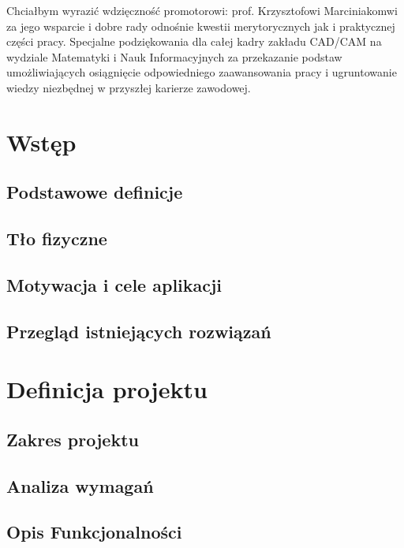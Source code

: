 \documentclass[12pt, oneside]{report}
\theoremstyle{definition}
\begin{document}
Chciałbym wyrazić wdzięczność promotorowi: prof. Krzysztofowi Marciniakomwi za jego wsparcie i dobre rady odnośnie kwestii merytorycznych jak i praktycznej części pracy. Specjalne podziękowania dla całej kadry zakładu CAD/CAM na wydziale Matematyki i Nauk Informacyjnych za przekazanie podstaw umożliwiających osiągnięcie odpowiedniego zaawansowania pracy i ugruntowanie wiedzy niezbędnej w przyszłej karierze zawodowej.

\vspace{\fill}

\newpage
\pagestyle{plain}
\setcounter{page}{5}
\tableofcontents

\newpage
\pagestyle{headings}

\chapter{Wstęp}
\section{Podstawowe definicje}
\section{Tło fizyczne}
\section{Motywacja i cele aplikacji}
\section{Przegląd istniejących rozwiązań}


\newpage
\chapter{Definicja projektu}
\section{Zakres projektu}
\section{Analiza wymagań}
\section{Opis Funkcjonalności}
\end{document}
